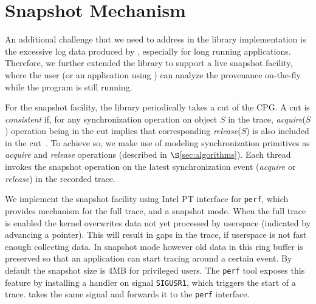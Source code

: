 \section{Snapshot Mechanism}
\label{sec:snapshot}
An additional challenge that we need to address in the library implementation is the excessive log data produced by \intelpt, especially for long running applications. Therefore, we further extended the library to support a live snapshot facility, where the user (or an application using \projecttitle) can analyze the provenance on-the-fly while the program is still running.

For the snapshot facility, the library periodically takes a cut of the CPG. A cut is {\em consistent} if, for any synchronization operation on object $S$ in the trace,  {\em acquire}($S$) operation being in the cut implies that corresponding {\em release}($S$) is also included in the cut~\cite{chandy-lamport}.  To achieve so, we make use of modeling synchronization primitives as {\em acquire} and {\em release} operations (described in $\S$\ref{sec:algorithms}). Each thread invokes the snapshot operation on the latest synchronization event ({\em acquire} or {\em release}) in the recorded trace.

We implement the snapshot facility using Intel PT interface for {\tt perf}, which provides mechanism for the full trace, and a snapshot mode.
When the full trace is enabled the kernel overwrites data not yet processed by
userspace (indicated by advancing a pointer). This will result in gaps in the
trace, if userspace is not fast enough collecting data. In snapshot mode however
old data in this ring buffer is preserved so that an application can start
tracing around a certain event. By default the snapshot size is 4MB for
privileged users. The {\tt perf} tool exposes this feature by installing a handler on
signal {\tt SIGUSR1}, which triggers the start of a trace. \projecttitle takes the same signal
and forwards it to the {\tt perf} interface.


%
